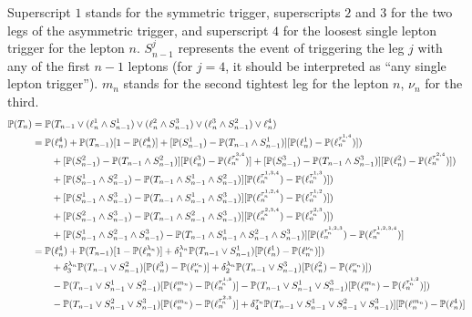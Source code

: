 \documentclass{article}
\newcommand{\pro}{\ensuremath{\mathbb{P}}}
\begin{document}
Superscript $1$ stands for the symmetric trigger, superscripts $2$ and $3$ for the two legs of the asymmetric trigger, 
and superscript $4$ for the loosest single lepton trigger for the lepton $n$. $S_{n-1}^j$ represents the event of 
triggering the leg $j$ with any of the first $n-1$ leptons (for $j=4$, it should be interpreted as ``any single lepton trigger''). 
$m_n$ stands for the second tightest leg for the lepton $n$, $\nu_n$ for the third. 
\begin{align}
\pro(T_n)&=
\pro(T_{n-1}\vee (\ell_n^1\wedge S_{n-1}^1) \vee (\ell_n^2\wedge S_{n-1}^3) 
\vee (\ell_n^3\wedge S_{n-1}^2) \vee \ell_n^4)\notag\\
%
&=\pro(\ell_n^4) + \pro(T_{n-1})[1-\pro(\ell_n^4)]
+ [\pro(S_{n-1}^1) - \pro(T_{n-1}\wedge S_{n-1}^1)][\pro(\ell_n^1)-\pro(\ell_n^{\tau_n^{1,4}})])\notag\\
&\qquad+[\pro(S_{n-1}^2) - \pro(T_{n-1}\wedge S_{n-1}^2)][\pro(\ell_n^3)-\pro(\ell_n^{\tau_n^{3,4}})]
+ [\pro(S_{n-1}^3) - \pro(T_{n-1}\wedge S_{n-1}^3)][\pro(\ell_n^2)-\pro(\ell_n^{\tau_n^{2,4}})])\notag\\
&\qquad + [\pro(S_{n-1}^1\wedge S_{n-1}^2) - \pro(T_{n-1}\wedge S_{n-1}^1\wedge S_{n-1}^2)]
[\pro(\ell_n^{\tau_n^{1,3,4}})-\pro(\ell_n^{\tau_n^{1,3}})])\notag\\
&\qquad+ [\pro(S_{n-1}^1\wedge S_{n-1}^3) - \pro(T_{n-1}\wedge S_{n-1}^1\wedge S_{n-1}^3)]
[\pro(\ell_n^{\tau_n^{1,2,4}})-\pro(\ell_n^{\tau_n^{1,2}})])\notag\\
&\qquad+ [\pro(S_{n-1}^2\wedge S_{n-1}^3) - \pro(T_{n-1}\wedge S_{n-1}^2\wedge S_{n-1}^3)]
[\pro(\ell_n^{\tau_n^{2,3,4}})-\pro(\ell_n^{\tau_n^{2,3}})])\notag\\
&\qquad+ [\pro(S_{n-1}^1\wedge S_{n-1}^2\wedge S_{n-1}^3) 
- \pro(T_{n-1}\wedge S_{n-1}^1\wedge S_{n-1}^2\wedge S_{n-1}^3)]
[\pro(\ell_n^{\tau_n^{1,2,3}})-\pro(\ell_n^{\tau_n^{1,2,3,4}})]\notag\\
%
&= \pro(\ell_n^4) + \pro(T_{n-1})[1 - \pro(\ell_n^{\lambda_n})]
+ \delta_1^{\lambda_n}\pro(T_{n-1}\vee S_{n-1}^1)
[\pro(\ell_n^1)-\pro(\ell_n^{\nu_n})])\notag\\
&\qquad+\delta_3^{\lambda_n}\pro(T_{n-1}\vee S_{n-1}^2)
[\pro(\ell_n^3)-\pro(\ell_n^{\nu_n})]
+ \delta_2^{\lambda_n}\pro(T_{n-1}\vee S_{n-1}^3)
[\pro(\ell_n^2)-\pro(\ell_n^{\nu_n})])\notag\\
&\qquad -\pro(T_{n-1}\vee S_{n-1}^1\vee S_{n-1}^2)
[\pro(\ell_n^{m_n})-\pro(\ell_n^{\tau_n^{1,3}})]
-\pro(T_{n-1}\vee S_{n-1}^1\vee S_{n-1}^3)[\pro(\ell_n^{m_n})-\pro(\ell_n^{\tau_n^{1,2}})])\notag\\
&\qquad -\pro(T_{n-1}\vee S_{n-1}^2\vee S_{n-1}^3)[\pro(\ell_n^{m_n})-\pro(\ell_n^{\tau_n^{2,3}})]
+ \delta_4^{\tau_n}\pro(T_{n-1}\vee S_{n-1}^1\vee S_{n-1}^2\vee S_{n-1}^3)]
[\pro(\ell_n^{m_n})-\pro(\ell_n^{4})]
\label{e:2s2a}
%
\end{align}
\end{document}

